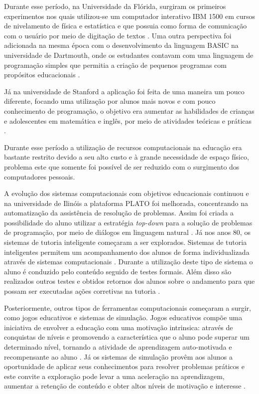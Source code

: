 Durante esse período, na Universidade da Flórida, surgiram os primeiros experimentos nos quais utilizou-se um computador interativo IBM 1500 em cursos de nivelamento de física e estatística e que possuia como forma de comunicação com o usuário por meio de digitação de textos \cite{chambers80}. Uma outra perspectiva foi adicionada na mesma época com o desenvolvimento da linguagem BASIC na universidade de Dartmouth, onde os estudantes contavam com uma linguagem de programação simples que permitia a criação de pequenos programas com propósitos educacionais \cite{chambers80}. 

Já na universidade de Stanford a aplicação foi feita de uma maneira um pouco diferente, focando uma utilização por alunos mais novos e com pouco conhecimento de programação, o objetivo era aumentar as habilidades de crianças e adolescentes em matemática e inglês, por meio de atividades teóricas e práticas \cite{chambers80}.

Durante esse período a utilização de recursos computacionais na educação era bastante restrito devido a seu alto custo e à grande necessidade de espaço físico, problema este que somente foi possível de ser reduzido com o surgimento dos computadores pessoais. 

A evolução dos sistemas computacionais com objetivos educacionais continuou e na universidade de Ilinóis a plataforma PLATO foi melhorada, concentrando na automatização da assistência de resolução de problemas. Assim foi criada a possibilidade do aluno utilizar a estratégia \emph{top-down} para a solução de problemas de programação, por meio de diálogos em linguagem natural \cite{danielson75}. Já nos anos 80, os sistemas de tutoria inteligente começaram a ser explorados. Sistemas de tutoria inteligentes permitem um acompanhamento dos alunos de forma individualizada através de sistemas computacionais \cite{bloom84}. Durante a utilização deste tipo de sistema o aluno é conduzido pelo conteúdo seguido de testes formais. Além disso são realizados outros testes e obtidos retornos dos alunos sobre o andamento para que possam ser executadas ações corretivas na tutoria \cite{bloom84}.

Posteriormente, outros tipos de ferramentas computacionais começaram a surgir, como jogos educativos e sistemas de simulação. Jogos educativos compõe uma iniciativa de envolver a educação com uma motivação intrinsica: através de conquistas de níveis e promovendo a característica que o aluno pode superar um determinado nível, tornando a atividade de aprendizagem auto-motivada e recompensante ao aluno \cite{amory99}. Já os sistemas de simulação provêm aos alunos a oportunidade de aplicar seus conhecimentos para resolver problemas práticos e este  convite a exploração pode levar a uma aceleração na aprendizagem, aumentar a retenção de conteúdo e obter altos níveis de motivação e interesse \cite{vandam07}.

